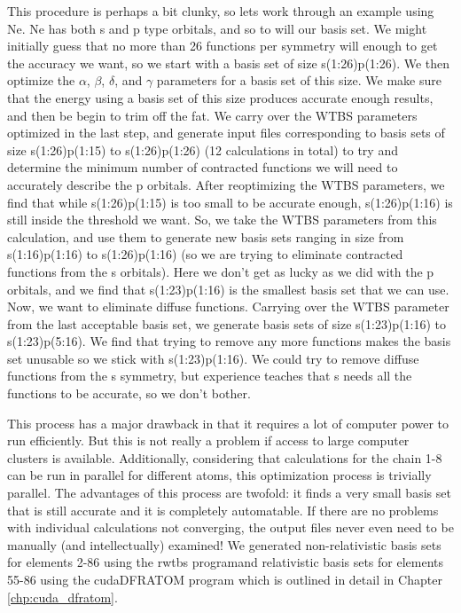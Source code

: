 This procedure is perhaps a bit clunky, so lets work through an example using Ne. Ne has both s and p type orbitals, and so to will our basis set. We might initially guess that no more than 26 functions per symmetry will enough to get the accuracy we want, so we start with a basis set of size s(1:26)p(1:26). We then optimize the $\alpha$, $\beta$, $\delta$, and $\gamma$ parameters for a basis set of this size. We make sure that the energy using a basis set of this size produces accurate enough results, and then be begin to trim off the fat. We carry over the WTBS parameters optimized in the last step, and generate input files corresponding to basis sets of size s(1:26)p(1:15) to s(1:26)p(1:26) (12 calculations in total) to try and determine the minimum number of contracted functions we will need to accurately describe the p orbitals. After reoptimizing the WTBS parameters, we find that while s(1:26)p(1:15) is too small to be accurate enough, s(1:26)p(1:16) is still inside the threshold we want. So, we take the WTBS parameters from this calculation, and use them to generate new basis sets ranging in size from s(1:16)p(1:16) to s(1:26)p(1:16) (so we are trying to eliminate contracted functions from the s orbitals). Here we don't get as lucky as we did with the p orbitals, and we find that s(1:23)p(1:16) is the smallest basis set that we can use. Now, we want to eliminate diffuse functions. Carrying over the WTBS parameter from the last acceptable basis set, we generate basis sets of size s(1:23)p(1:16) to s(1:23)p(5:16). We find that trying to remove any more functions makes the basis set unusable so we stick with s(1:23)p(1:16). We could try to remove diffuse functions from the s symmetry, but experience teaches that s needs all the functions to be accurate, so we don't bother.

This process has a major drawback in that it requires a lot of computer power to run efficiently. But this is not really a problem if access to large computer clusters is available. Additionally, considering that calculations for the chain 1-8 can be run in parallel for different atoms, this optimization process is trivially parallel. The advantages of this process are twofold: it finds a very small basis set that is still accurate and it is completely automatable. If there are no problems with individual calculations not converging, the output files never even need to be manually (and intellectually) examined! We generated non-relativistic basis sets for elements 2-86 using the rwtbs program\citethis and relativistic basis sets for elements 55-86 using the cudaDFRATOM program which is outlined in detail in Chapter \ref{chp:cuda_dfratom}.

